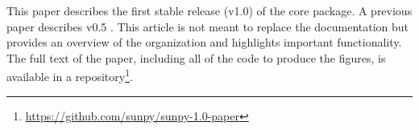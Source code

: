This paper describes the first stable release (v1.0) of the core package.
A previous paper describes v0.5 \citep{Community:2015cy}.
This article is not meant to replace the \sunpypkg documentation but provides an overview of the organization and highlights important functionality.
The full text of the paper, including all of the code to produce the figures, is available in a \github repository\footnote{\url{https://github.com/sunpy/sunpy-1.0-paper}}.
